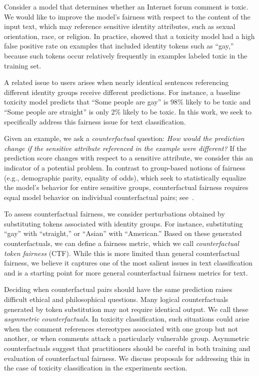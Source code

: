 \documentclass[letterpaper]{article} %
\theoremstyle{definition}
\begin{document}
Consider a model that determines whether an Internet forum comment is toxic. We would like to improve the model's fairness with respect to the {content} of the input text, which may reference sensitive identity attributes, such as sexual orientation, race, or religion. 
In practice, \citeauthor{Dixon18} showed that a toxicity model had a high false positive rate on examples that included identity tokens such as ``gay,'' because such tokens occur relatively frequently in examples labeled toxic in the training set. 

A related issue to users arises when nearly identical sentences referencing different identity groups receive  different predictions. For instance, a baseline toxicity model predicts that ``Some people are gay'' is 98\% likely to be toxic and ``Some people are straight'' is only 2\% likely to be toxic. In this work, we seek to specifically address this fairness issue for text classification.

Given an example, we ask a \emph{counterfactual} question: \emph{How would the prediction change if the sensitive attribute referenced in the example were different?} 
If the prediction score changes with respect to a sensitive attribute, we consider this an indicator of a potential problem.
In contrast to group-based notions of fairness (e.g., demographic parity, equality of odds), which seek to statistically equalize the model's behavior for entire sensitive groups, counterfactual fairness requires equal model behavior on individual counterfactual pairs; see~\cite{Kusner17,Wachter17}. 

To assess counterfactual fairness, we consider perturbations obtained by substituting tokens associated with identity groups. For instance, substituting ``gay'' with ``straight,'' or ``Asian'' with ``American.'' Based on these generated counterfactuals, we can define a fairness metric, which we call \emph{counterfactual token fairness} (CTF). While this is more limited than general counterfactual fairness, we believe it captures one of the most salient issues in text classification and is a starting point for more general counterfactual fairness metrics for text.

Deciding when counterfactual pairs should have the same prediction raises difficult ethical and philosophical questions. Many logical counterfactuals generated by token substitution may not require identical output. We call these \emph{asymmetric counterfactuals}. In toxicity classification, such situations could arise when the comment references stereotypes associated with one group but not another, or when comments attack a particularly vulnerable group. Asymmetric counterfactuals suggest that practitioners should be careful in both training and evaluation of counterfactual fairness. We discuss proposals for addressing this in the case of toxicity classification in the experiments section. 
\end{document}
